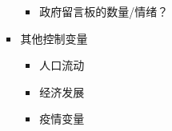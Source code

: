 \documentclass[
  12pt,
]{ctexart}
\providecommand{\tightlist}{%
  \setlength{\itemsep}{0pt}\setlength{\parskip}{0pt}}
\begin{document}
\begin{itemize}
\begin{itemize}
\begin{itemize}
      \begin{itemize}
      \tightlist
      \item
        政府留言板的数量/情绪？
      \end{itemize}
    \item
      其他控制变量

      \begin{itemize}
      \tightlist
      \item
        人口流动
      \item
        经济发展
      \item
        疫情变量
      \end{itemize}
    \end{itemize}
  \end{itemize}
\end{itemize}
\end{document}
